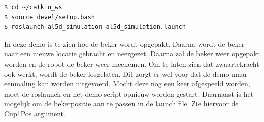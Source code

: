 \documentclass[11pt,titlepage]{article}
\begin{document}
\begin{verbatim}
$ cd ~/catkin_ws
$ source devel/setup.bash
$ roslaunch al5d_simulation al5d_simulation.launch 
\end{verbatim}

In deze demo is te zien hoe de beker wordt opgepakt. Daarna wordt de beker naar een nieuwe locatie gebracht en neergezet. Daarna zal de beker weer opgepakt worden en de robot de beker weer meenemen. Om te laten zien dat zwaartekracht ook werkt, wordt de beker losgelaten. Dit zorgt er wel voor dat de demo maar eenmaling kan worden uitgevoerd. Mocht deze nog een keer afgespeeld worden, moet de roslaunch en het demo script opnieuw worden gestart.
\newline
Daarnaast is het mogelijk om de bekerpositie aan te passen in de launch file. Zie hiervoor de Cup1Pos argument.
\end{document}
